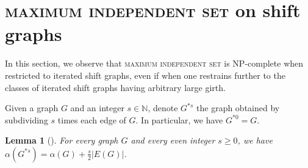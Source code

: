 \documentclass[11pt,a4aper]{article}
\newtheorem{lemma}[theorem]{Lemma}
\renewcommand{\geq}{\geqslant}
\DeclareRobustCommand*{\ora}{\overrightarrow}
\newcommand*{\orH}{\ora{H}}
\newcommand{\defin}[1]{\emph{\textcolor{ForestGreen}{#1}}}
\newcommand{\ugo}[1]{{\color{red} UG: #1}}
\begin{document}


\section{\textsc{maximum independent set} on shift graphs}\label{sec:MIS}

In this section, we observe that \textsc{maximum independent set} is NP-complete when restricted to iterated shift graphs, even if when one restrains further to the classes of iterated shift graphs having arbitrary large girth.

Given a graph $G$ and an integer $s \in \mathbb N$, denote $G^{\ast s}$ the
graph obtained by subdividing $s$ times each edge of $G$. In particular, we
have $G^{\ast 0}=G$.

\begin{lemma}[\cite{poljak1974Note}]\label{lem:subdivision_MIS}
  For every graph $G$ and every even integer $s \geq 0$, we have
  $\alpha(G^{\ast s}) = \alpha(G) + \frac{s}2|E(G)|$.
\end{lemma}
\end{document}
